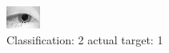 \begin{figure}[h!]
\begin{center}
\includegraphics[width=0.60\columnwidth]{figures/ID1425_class_2_target_1.png}
\end{center}
\caption{ Classification: 2 actual target: 1}
\label{fig:ID1425_class_2_target_1}
\end{figure}
